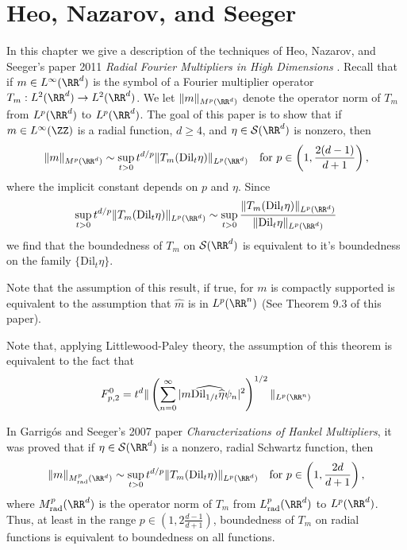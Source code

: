 \chapter{Heo, Nazarov, and Seeger}

In this chapter we give a description of the techniques of Heo, Nazarov, and Seeger's paper 2011 \emph{Radial Fourier Multipliers in High Dimensions} \cite{HeoNazrovSeeger2011}. Recall that if $m \in L^\infty(\RR^d)$ is the symbol of a Fourier multiplier operator $T_m: L^2(\RR^d) \to L^2(\RR^d)$. We let $\| m \|_{M^p(\RR^d)}$ denote the operator norm of $T_m$ from $L^p(\RR^d)$ to $L^p(\RR^d)$. The goal of this paper is to show that if $m \in L^\infty(\ZZ)$ is a radial function, $d \geq 4$, and $\eta \in \mathcal{S}(\RR^d)$ is nonzero, then
%
\[ \| m \|_{M^p(\RR^d)} \sim \sup_{t > 0} t^{d/p} \| T_m(\text{Dil}_t \eta) \|_{L^p(\RR^d)} \quad \text{for}\ p \in \left(1, \frac{2(d-1)}{d+1} \right), \]
%
where the implicit constant depends on $p$ and $\eta$. Since
%
\[ \sup_{t > 0} t^{d/p} \| T_m(\text{Dil}_t \eta) \|_{L^p(\RR^d)} \sim \sup_{t > 0} \frac{\| T_m(\text{Dil}_t \eta) \|_{L^p(\RR^d)}}{\| \text{Dil}_t \eta \|_{L^p(\RR^d)}} \]
%
we find that the boundedness of $T_m$ on $\mathcal{S}(\RR^d)$ is equivalent to it's boundedness on the family $\{ \text{Dil}_t \eta \}$.

Note that the assumption of this result, if true, for $m$ is compactly supported is equivalent to the assumption that $\widehat{m}$ is in $L^p(\RR^n)$ (See Theorem 9.3 of this paper).

Note that, applying Littlewood-Paley theory, the assumption of this theorem is equivalent to the fact that
%
\[ F_{p,2}^0 = t^d \| \left( \sum_{n = 0}^\infty |\widehat{m \text{Dil}_{1/t} \widehat{\eta} \psi_n}|^2 \right)^{1/2} \|_{L^p(\RR^n)} \]

In Garrig\'{o}s and Seeger's 2007 paper \emph{Characterizations of Hankel Multipliers}, it was proved that if $\eta \in \mathcal{S}(\RR^d)$ is a nonzero, radial Schwartz function, then
%
\[ \| m \|_{M^p_{\text{rad}}(\RR^d)} \sim \sup_{t > 0} t^{d/p}  \| T_m(\text{Dil}_t \eta) \|_{L^p(\RR^d)}\quad\text{for}\ p \in \left( 1, \frac{2d}{d+1} \right), \]
%
where $M^p_{\text{rad}}(\RR^d)$ is the operator norm of $T_m$ from $L^p_{\text{rad}}(\RR^d)$ to $L^p(\RR^d)$. Thus, at least in the range $p \in \left( 1, 2\frac{d-1}{d+1} \right)$, boundedness of $T_m$ on radial functions is equivalent to boundedness on all functions.

